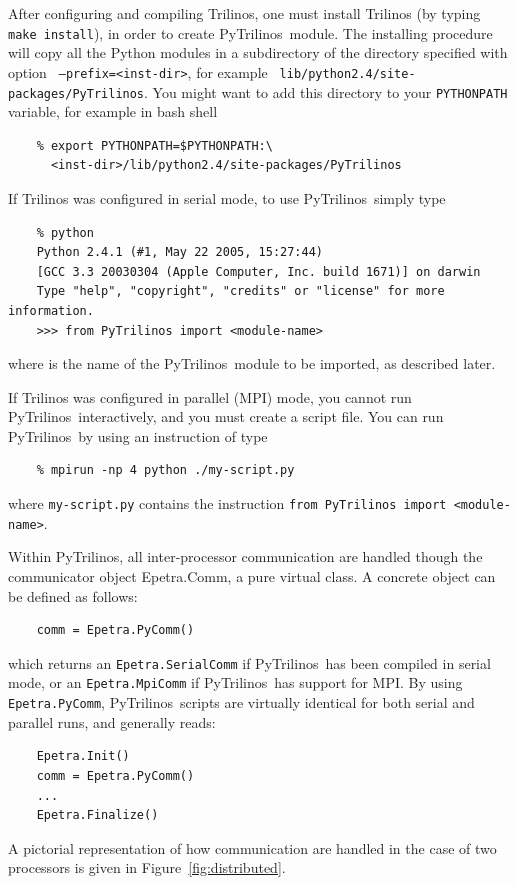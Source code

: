 \documentclass[10pt,relax]{SANDreport}
\newcommand{\PyTrilinos}{{PyTrilinos}}
\begin{document}
After configuring and compiling Trilinos, one must install Trilinos
(by typing {\tt make install}), in order to create \PyTrilinos\ module.
The installing procedure will copy all the Python modules in a
subdirectory of the directory specified with option {\tt
  --prefix=<inst-dir>}, for example {\tt
  lib/python2.4/site-packages/PyTrilinos}. You might want to add this
directory to your {\tt PYTHONPATH} variable, for example in bash shell
\begin{verbatim}
    % export PYTHONPATH=$PYTHONPATH:\
      <inst-dir>/lib/python2.4/site-packages/PyTrilinos
\end{verbatim}

If Trilinos was configured in serial mode, to use \PyTrilinos\ simply
type
\begin{verbatim}
    % python
    Python 2.4.1 (#1, May 22 2005, 15:27:44) 
    [GCC 3.3 20030304 (Apple Computer, Inc. build 1671)] on darwin
    Type "help", "copyright", "credits" or "license" for more information.
    >>> from PyTrilinos import <module-name>
\end{verbatim}
where {\tt <module-name>} is the name of the \PyTrilinos\ module to be
imported, as described later.

If Trilinos was configured in parallel (MPI) mode, you cannot run
\PyTrilinos\ interactively, and you must create a script file. You can
run \PyTrilinos\ by using an instruction of type
\begin{verbatim}
    % mpirun -np 4 python ./my-script.py
\end{verbatim}
where {\tt my-script.py} contains the instruction {\tt from PyTrilinos
  import <module-name>}.

Within \PyTrilinos, all inter-processor communication are handled
though the communicator object Epetra.Comm, a pure virtual class. A
concrete object can be defined as follows:
\begin{verbatim}
    comm = Epetra.PyComm()
\end{verbatim}
which returns an {\tt Epetra.SerialComm} if \PyTrilinos\ has been compiled
in serial mode, or an {\tt Epetra.MpiComm} if \PyTrilinos\ has support for
MPI. By using {\tt Epetra.PyComm}, \PyTrilinos\ scripts are virtually
identical for both serial and parallel runs, and generally reads:
\begin{verbatim}
    Epetra.Init()
    comm = Epetra.PyComm()
    ...
    Epetra.Finalize()
\end{verbatim}

A pictorial representation of how communication are handled in
the case of two  processors is given in Figure~\ref{fig:distributed}.
\end{document}
